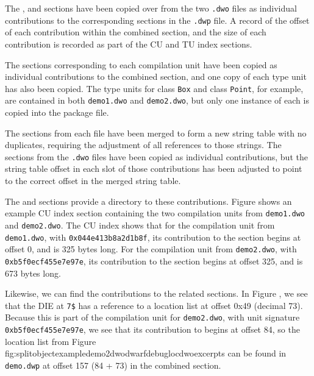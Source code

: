 \bb
The \dotdebugabbrevdwo{}, \dotdebuglocdwo{} and \dotdebuglinedwo{}
sections have been copied over from the two \texttt{.dwo} files as
individual contributions to the corresponding sections in the
\texttt{.dwp} file. A record of the offset of each contribution within 
the combined section, and the size of each contribution is recorded
as part of the CU and TU index sections.

The \dotdebuginfodwo{} sections corresponding to each compilation
unit have been copied as individual contributions to the combined
\dotdebuginfodwo{} section, and one copy of each type unit has also
been copied. The type units for class \texttt{Box} and class 
\texttt{Point}, for example, are contained in both \texttt{demo1.dwo} 
and \texttt{demo2.dwo}, but only one instance of each is copied into 
the package file.

The \dotdebugstrdwo{} sections from each file have been merged to
form a new string table with no duplicates, requiring the
adjustment of all references to those strings. The
\dotdebugstroffsetsdwo{} sections from the \texttt{.dwo} files have 
been copied as individual contributions, but the string table offset
in each slot of those contributions has been adjusted to point to
the correct offset in the merged string table.

The \dotdebugcuindex{} and \dotdebugtuindex{} sections provide a
directory to these contributions. 
Figure  shows an example CU
index section containing the two compilation units from 
\texttt{demo1.dwo} and \texttt{demo2.dwo}. The CU index shows that 
for the compilation unit from \texttt{demo1.dwo}, with \CUsignature{} 
\texttt{0x044e413b8a2d1b8f}, its contribution to the \dotdebuginfodwo{} 
section begins at offset 0, and is 325 bytes long. For the compilation 
unit from \texttt{demo2.dwo}, with \CUsignature{} 
\texttt{0xb5f0ecf455e7e97e}, its contribution to the \dotdebuginfodwo{}
section begins at offset 325, and is 673 bytes long.

Likewise, we can find the contributions to the related sections.
In Figure , 
we see that the \DWTAGvariable{} DIE at \texttt{7\$} has a
reference to a location list at offset 0x49 (decimal 73). Because
this is part of the compilation unit for \texttt{demo2.dwo}, with 
unit signature \texttt{0xb5f0ecf455e7e97e}, we see that its contribution 
to \dotdebuglocdwo{} begins at offset 84, so the location list from
Figure {fig:splitobjectexampledemo2dwodwarfdebuglocdwoexcerpts} 
can be found in \texttt{demo.dwp} at offset 157 (84 + 73) in
the combined \dotdebuglocdwo{} section.
\eb

